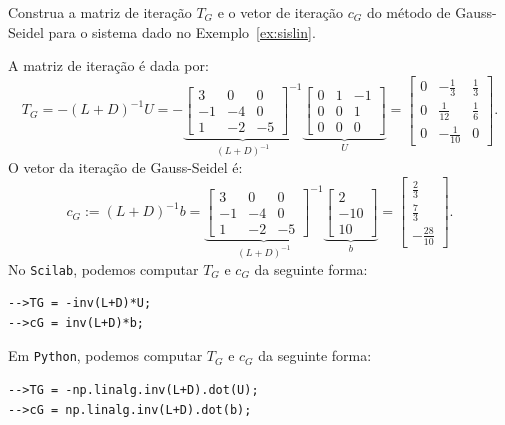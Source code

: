 \begin{ex}
  Construa a matriz de iteração $T_G$ e o vetor de iteração $c_G$ do método de Gauss-Seidel para o sistema dado no Exemplo~\ref{ex:sislin}.
\end{ex}
\begin{sol}
  A matriz de iteração é dada por:
  \begin{equation*}
    T_G = -(L+D)^{-1}U = -
     \underbrace{\begin{bmatrix}
      3 & 0 & 0\\
      -1 & -4 & 0\\
      1 & -2 & -5
    \end{bmatrix}^{-1}}_{(L + D)^{-1}}
  \underbrace{\begin{bmatrix}
    0 & 1 & -1\\
    0 & 0 & 1\\
    0 & 0 & 0
  \end{bmatrix}}_{U} =
\begin{bmatrix}
  0 & -\frac{1}{3} & \frac{1}{3}\\
  0 & \frac{1}{12} & \frac{1}{6}\\
  0 & -\frac{1}{10} & 0
\end{bmatrix}.
  \end{equation*}
O vetor da iteração de Gauss-Seidel é:
\begin{equation*}
  c_G := (L+D)^{-1}b =
    \underbrace{\begin{bmatrix}
      3 & 0 & 0\\
      -1 & -4 & 0\\
      1 & -2 & -5
    \end{bmatrix}^{-1}}_{(L + D)^{-1}}
    \underbrace{\begin{bmatrix}
      2\\
      -10\\
      10
    \end{bmatrix}}_{b} =
    \begin{bmatrix}
      \frac{2}{3}\\
      \frac{7}{3}\\
      -\frac{28}{10}
    \end{bmatrix}.
\end{equation*}
\ifisscilab
No \verb+Scilab+, podemos computar $T_G$ e $c_G$ da seguinte forma:
\begin{verbatim}
-->TG = -inv(L+D)*U;
-->cG = inv(L+D)*b;
\end{verbatim}
\fi
\ifispython
Em \verb+Python+, podemos computar $T_G$ e $c_G$ da seguinte forma:
\begin{verbatim}
-->TG = -np.linalg.inv(L+D).dot(U);
-->cG = np.linalg.inv(L+D).dot(b);
\end{verbatim}
\fi
\end{sol}

